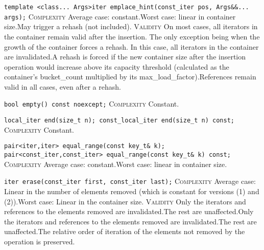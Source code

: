 \noindent{}\hspace*{0.25em}\lstinline[basicstyle=\ttfamily\color{corange}]{template <class... Args>iter emplace_hint(const_iter pos, Args&&... args);} \textsc{Complexity} Average case: constant.Worst case: linear in container size.May trigger a rehash (not included). \textsc{Validity} On most cases, all iterators in the container remain valid after the insertion. The only exception being when the growth of the container forces a rehash. In this case, all iterators in the container are invalidated.A rehash is forced if the new container size after the insertion operation would increase above its capacity threshold (calculated as the container's bucket\_count multiplied by its max\_load\_factor).References remain valid in all cases, even after a rehash.\\\vspace{-0.6em}

\noindent{}\hspace*{0.25em}\lstinline[basicstyle=\ttfamily\color{cgreen}]{bool empty() const noexcept;} \textsc{Complexity} Constant.\\\vspace{-0.6em}

\noindent{}\hspace*{0.25em}\lstinline[basicstyle=\ttfamily\color{cgreen}]{local_iter end(size_t n); const_local_iter end(size_t n) const;} \textsc{Complexity} Constant.\\\vspace{-0.6em}

\noindent{}\hspace*{0.25em}\lstinline[basicstyle=\ttfamily\color{corange}]{pair<iter,iter> equal_range(const key_t& k); pair<const_iter,const_iter> equal_range(const key_t& k) const;} \textsc{Complexity} Average case: constant.Worst case: linear in container size.\\\vspace{-0.6em}

\noindent{}\hspace*{0.25em}\lstinline[basicstyle=\ttfamily\color{corange}]{iter erase(const_iter first, const_iter last);} \textsc{Complexity} Average case: Linear in the number of elements removed (which is constant for versions (1) and (2)).Worst case: Linear in the container size. \textsc{Validity} Only the iterators and references to the elements removed are invalidated.The rest are unaffected.Only the iterators and references to the elements removed are invalidated.The rest are unaffected.The relative order of iteration of the elements not removed by the operation is preserved.\\\vspace{-0.6em}

